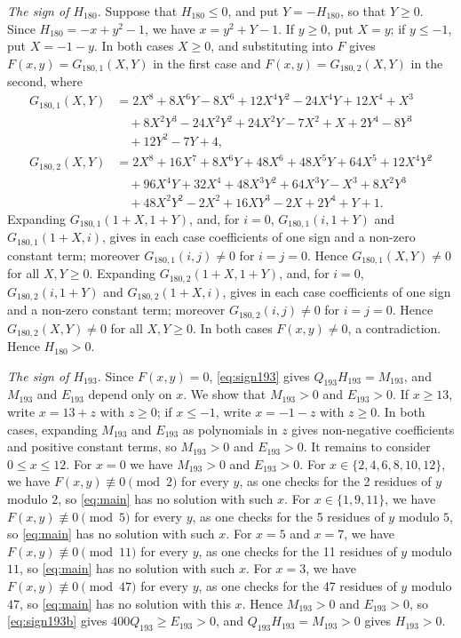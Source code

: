 \documentclass[11pt]{article}
\begin{document}
\emph{The sign of $H_{180}$.} Suppose that $H_{180}\leq0$, and put $Y=-H_{180}$, so that $Y\geq0$. Since $H_{180}=-x+y^{2}-1$, we have $x=y^{2}+Y-1$. If $y\geq0$, put $X=y$; if $y\leq-1$, put $X=-1-y$. In both cases $X\geq0$, and substituting into $F$ gives $F(x,y)=G_{180,1}(X,Y)$ in the first case and $F(x,y)=G_{180,2}(X,Y)$ in the second, where
\begin{align*}
G_{180,1}(X,Y)&=2X^{8}+8X^{6}Y-8X^{6}+12X^{4}Y^{2}-24X^{4}Y+12X^{4}+X^{3}\\
&\quad+8X^{2}Y^{3}-24X^{2}Y^{2}+24X^{2}Y-7X^{2}+X+2Y^{4}-8Y^{3}\\
&\quad+12Y^{2}-7Y+4,\\
G_{180,2}(X,Y)&=2X^{8}+16X^{7}+8X^{6}Y+48X^{6}+48X^{5}Y+64X^{5}+12X^{4}Y^{2}\\
&\quad+96X^{4}Y+32X^{4}+48X^{3}Y^{2}+64X^{3}Y-X^{3}+8X^{2}Y^{3}\\
&\quad+48X^{2}Y^{2}-2X^{2}+16XY^{3}-2X+2Y^{4}+Y+1.
\end{align*}
Expanding $G_{180,1}(1+X,1+Y)$, and, for $i=0$, $G_{180,1}(i,1+Y)$ and $G_{180,1}(1+X,i)$, gives in each case coefficients of one sign and a non-zero constant term; moreover $G_{180,1}(i,j)\neq0$ for $i=j=0$. Hence $G_{180,1}(X,Y)\neq0$ for all $X,Y\geq0$. Expanding $G_{180,2}(1+X,1+Y)$, and, for $i=0$, $G_{180,2}(i,1+Y)$ and $G_{180,2}(1+X,i)$, gives in each case coefficients of one sign and a non-zero constant term; moreover $G_{180,2}(i,j)\neq0$ for $i=j=0$. Hence $G_{180,2}(X,Y)\neq0$ for all $X,Y\geq0$. In both cases $F(x,y)\neq0$, a contradiction. Hence $H_{180}>0$.

\emph{The sign of $H_{193}$.} Since $F(x,y)=0$, \eqref{eq:sign193} gives $Q_{193}H_{193}=M_{193}$, and $M_{193}$ and $E_{193}$ depend only on $x$. We show that $M_{193}>0$ and $E_{193}>0$. If $x\geq13$, write $x=13+z$ with $z\geq0$; if $x\leq-1$, write $x=-1-z$ with $z\geq0$. In both cases, expanding $M_{193}$ and $E_{193}$ as polynomials in $z$ gives non-negative coefficients and positive constant terms, so $M_{193}>0$ and $E_{193}>0$. It remains to consider $0\leq x\leq12$. For $x=0$ we have $M_{193}>0$ and $E_{193}>0$. For $x\in\{2,\allowbreak 4,\allowbreak 6,\allowbreak 8,\allowbreak 10,\allowbreak 12\}$, we have $F(x,y)\not\equiv0\pmod{2}$ for every $y$, as one checks for the 2 residues of $y$ modulo $2$, so \eqref{eq:main} has no solution with such $x$. For $x\in\{1,\allowbreak 9,\allowbreak 11\}$, we have $F(x,y)\not\equiv0\pmod{5}$ for every $y$, as one checks for the 5 residues of $y$ modulo $5$, so \eqref{eq:main} has no solution with such $x$. For $x=5$ and $x=7$, we have $F(x,y)\not\equiv0\pmod{11}$ for every $y$, as one checks for the 11 residues of $y$ modulo $11$, so \eqref{eq:main} has no solution with such $x$. For $x=3$, we have $F(x,y)\not\equiv0\pmod{47}$ for every $y$, as one checks for the 47 residues of $y$ modulo $47$, so \eqref{eq:main} has no solution with this $x$. Hence $M_{193}>0$ and $E_{193}>0$, so \eqref{eq:sign193b} gives $400Q_{193}\geq E_{193}>0$, and $Q_{193}H_{193}=M_{193}>0$ gives $H_{193}>0$.
\end{document}
